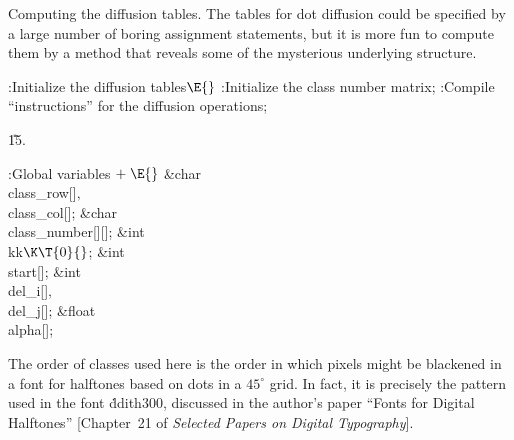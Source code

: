 Computing the diffusion tables. The tables for dot diffusion could be
specified by a large number of boring assignment statements, but it is more
fun to compute them by a method that reveals some of the mysterious underlying
structure.

\Y\B\4:Initialize the diffusion tables\X${}\E{}$\6
:Initialize the class number matrix\X;\6
:Compile ``instructions'' for the diffusion operations\X;\par
\U15.\fi

\B{}:Global variables\X${}\mathrel+\E{}$\6
\&{char} \\{class\_row}[]${},{}$ \\{class\_col}[];\6
\&{char} \\{class\_number}[][];%
\6
\&{int} \\{kk}${}\K\T{0}{}$;\6
\&{int} \\{start}[];\6
\&{int} \\{del\_i}[]${},{}$ \\{del\_j}[];\6
\&{float} \\{alpha}[];\par
\fi

The order of classes used here is the order in which pixels might be
blackened in a font for halftones based on dots in a $45^\circ$ grid.
In fact, it is precisely the pattern used in the font \.{ddith300},
discussed in the author's paper ``Fonts for Digital Halftones''
[Chapter~21 of {\sl Selected Papers on Digital Typography\/}].

